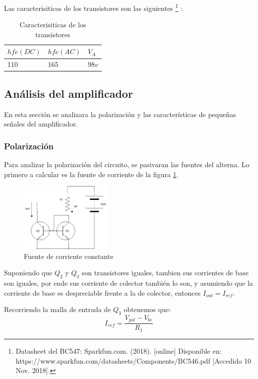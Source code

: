 \documentclass[../../main.tex]{subfiles}
\begin{document}
Las caracterisiticas de los transistores son las siguientes \footnote{Datasheet del BC547: Sparkfun.com. (2018). [online] Disponible en: https://www.sparkfun.com/datasheets/Components/BC546.pdf [Accedido 10 Nov. 2018].} :

\begin{table}[h]
\begin{center}
\begin{tabular}{|l|l|l|}
\hline
$hfe(DC)$& $hfe(AC)$&$V_A$\\
\hline \hline
110&165 &$98v$\\ \hline

\end{tabular}
\caption{Caracterisiticas de los transistores} \label{tab:qcar}
\end{center}
\end{table}

\subsection{Análisis del amplificador}
En esta sección se analizara la polarización y las características de pequeñas señales del amplificador.
\subsubsection{Polarización}
Para analizar la polarización del circuito, se pasivaran las fuentes del alterna. Lo primero a calcular es la fuente de corriente de la figura \ref{fig:ms}.

\begin{figure}[H]	
	\centering
	\includegraphics[width=0.4\textwidth]{imagenes/mirrorsource.png}
	\caption{Fuente de corriente constante}\label{fig:ms}
\end{figure}
Suponiendo que $Q_2$ y $Q_3$ son transistores iguales, tambien sus corrientes de base son iguales, por ende sus corriente de colector también lo son, y asumiendo que la corriente de base es despreciable frente a la de colector, entonces $I_{out}=I_{ref}$. 
\par Recorriendo la malla de entrada de $Q_3$ obtenemos que:
\begin{equation}
I_{ref}=\frac{V_{pol}-V_{be}}{R_1}\label{eq:mss}
\end{equation}
\end{document}
